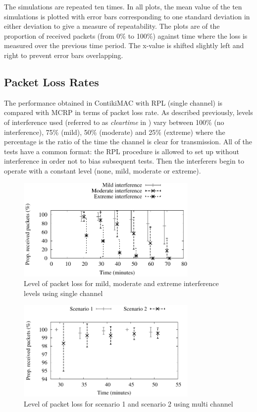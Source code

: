 
The simulations are repeated ten times. In all plots, the mean value of the ten simulations is plotted with error bars corresponding to one standard deviation in either deviation to give a measure of repeatability. The plots are of the proportion of received packets (from 0\% to 100\%) against time where the loss is measured over the previous time period.  The x-value is shifted slightly left and right to prevent error bars overlapping.

\subsection{Packet Loss Rates}
The performance obtained in ContikiMAC with RPL (single channel) is compared with MCRP in terms of packet loss rate.
As described previously, levels of interference used (referred to as \emph{clear\textunderscore time} in \cite{interferenceModel}) vary between 100\% (no interference), 75\% (mild), 50\% (moderate) and 25\% (extreme) where the percentage is the ratio of the time the channel is clear for transmission.  All of the tests have a common format: the RPL procedure is allowed to set up without interference in order not to bias subsequent tests.
Then the interferers begin to operate with a constant level (none, mild, moderate or extreme).

\begin{figure}
\centering
\includegraphics[width=0.78\textwidth]{single_channel.pdf}
\caption{Level of packet loss for mild, moderate and extreme interference levels using single channel}
\label{fig:interference}
\end{figure}

\begin{figure}
\centering
\includegraphics[width=0.78\textwidth]{multi_channel.pdf}
\caption{Level of packet loss for scenario 1 and scenario 2 using multi channel}
\label{fig:multi_interference}
\end{figure}

